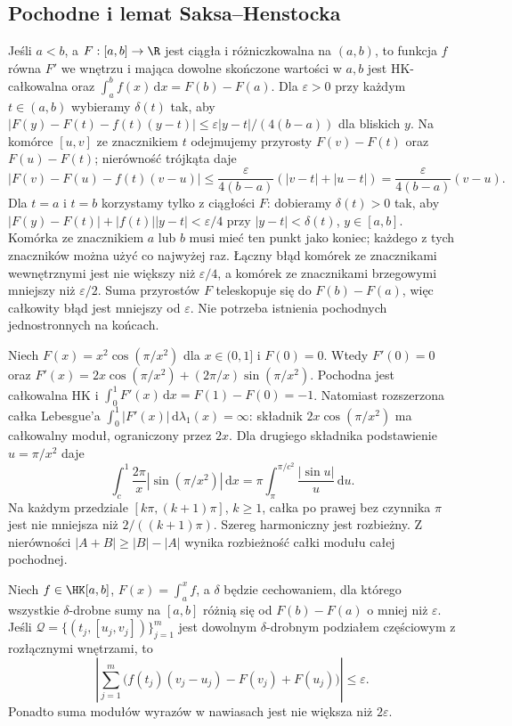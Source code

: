 \subsection{Pochodne i lemat Saksa--Henstocka}
\begin{przyklad}
Jeśli $a<b$, a $F:[a,b]\to\R$ jest ciągła i różniczkowalna na $(a,b)$, to funkcja $f$ równa $F'$ we wnętrzu i mająca dowolne skończone wartości w $a,b$ jest HK-całkowalna oraz $\int_a^b f(x)\,\mathrm dx=F(b)-F(a)$. Dla $\varepsilon>0$ przy każdym $t\in(a,b)$ wybieramy $\delta(t)$ tak, aby $|F(y)-F(t)-f(t)(y-t)|\le\varepsilon|y-t|/(4(b-a))$ dla bliskich $y$. Na komórce $[u,v]$ ze znacznikiem $t$ odejmujemy przyrosty $F(v)-F(t)$ oraz $F(u)-F(t)$; nierówność trójkąta daje
\[
 |F(v)-F(u)-f(t)(v-u)|
 \le \frac{\varepsilon}{4(b-a)}(|v-t|+|u-t|)
 =\frac{\varepsilon}{4(b-a)}(v-u).
\]
Dla $t=a$ i $t=b$ korzystamy tylko z ciągłości $F$: dobieramy $\delta(t)>0$ tak, aby $|F(y)-F(t)|+|f(t)||y-t|<\varepsilon/4$ przy $|y-t|<\delta(t)$, $y\in[a,b]$. Komórka ze znacznikiem $a$ lub $b$ musi mieć ten punkt jako koniec; każdego z tych znaczników można użyć co najwyżej raz. Łączny błąd komórek ze znacznikami wewnętrznymi jest nie większy niż $\varepsilon/4$, a komórek ze znacznikami brzegowymi mniejszy niż $\varepsilon/2$. Suma przyrostów $F$ teleskopuje się do $F(b)-F(a)$, więc całkowity błąd jest mniejszy od $\varepsilon$. Nie potrzeba istnienia pochodnych jednostronnych na końcach.
\end{przyklad}
\begin{przyklad}\label{ma1:kh:ex:conditional-derivative}
Niech $F(x)=x^2\cos(\pi/x^2)$ dla $x\in(0,1]$ i $F(0)=0$. Wtedy $F'(0)=0$ oraz $F'(x)=2x\cos(\pi/x^2)+(2\pi/x)\sin(\pi/x^2)$. Pochodna jest całkowalna HK i $\int_0^1F'(x)\,\mathrm dx=F(1)-F(0)=-1$. Natomiast rozszerzona całka Lebesgue'a $\int_0^1|F'(x)|\,\mathrm d\lambda_1(x)=\infty$:  składnik $2x\cos(\pi/x^2)$ ma całkowalny moduł, ograniczony przez $2x$. Dla drugiego składnika podstawienie $u=\pi/x^2$ daje
\[
 \int_c^1\frac{2\pi}{x}|\sin(\pi/x^2)|\,\mathrm dx
 =\pi\int_\pi^{\pi/c^2}\frac{|\sin u|}{u}\,\mathrm du.
\]
Na każdym przedziale $[k\pi,(k+1)\pi]$, $k\ge1$, całka po prawej bez czynnika $\pi$ jest nie mniejsza niż $2/((k+1)\pi)$. Szereg harmoniczny jest rozbieżny. Z nierówności $|A+B|\ge|B|-|A|$ wynika rozbieżność całki modułu całej pochodnej.
\end{przyklad}
\begin{lemat}\label{ma1:kh:lem:kh-saks-henstock}\label{it:lem:kh-saks-henstock}\label{ma1:kh:lem:hk-uzupelnianie}\label{lem:hk-uzupelnianie}
Niech $f\in\HK[a,b]$, $F(x)=\int_a^x f$, a $\delta$ będzie cechowaniem, dla którego wszystkie $\delta$-drobne sumy na $[a,b]$ różnią się od $F(b)-F(a)$ o mniej niż $\varepsilon$. Jeśli $\mathcal Q=\{(t_j,[u_j,v_j])\}_{j=1}^m$ jest dowolnym $\delta$-drobnym podziałem częściowym z rozłącznymi wnętrzami, to
\[
\left|\sum_{j=1}^m\bigl(f(t_j)(v_j-u_j)-F(v_j)+F(u_j)\bigr)\right|\le\varepsilon.
\]
Ponadto suma modułów wyrazów w nawiasach jest nie większa niż $2\varepsilon$.
\end{lemat}
